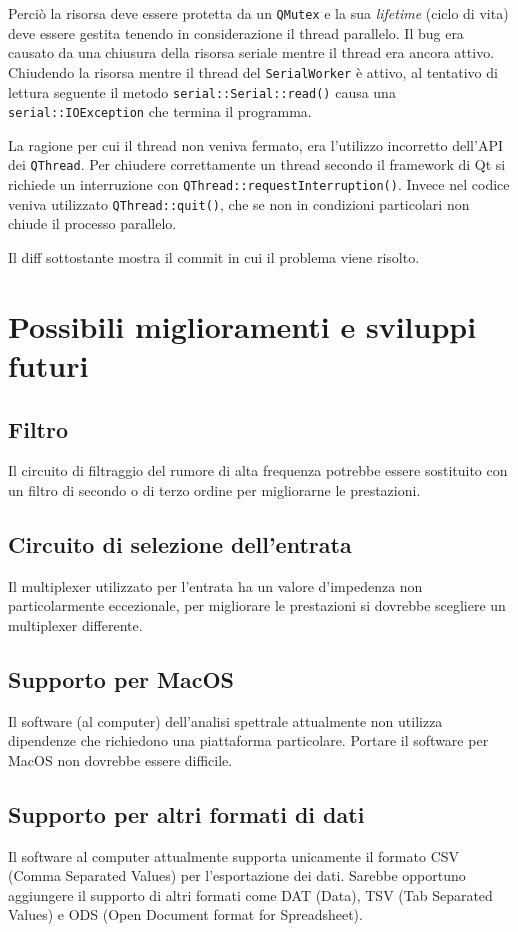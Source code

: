 Perci\`o la risorsa deve essere protetta da un \texttt{QMutex} e la sua
\emph{lifetime} (ciclo di vita) deve essere gestita tenendo in considerazione
il thread parallelo.  Il bug era causato da una chiusura della risorsa seriale
mentre il thread era ancora attivo.  Chiudendo la risorsa mentre il thread del
\texttt{SerialWorker} \`e attivo, al tentativo di lettura seguente il metodo
\texttt{serial::Serial::read()} causa una \texttt{serial::IOException} che
termina il programma.

La ragione per cui il thread non veniva fermato, era l'utilizzo incorretto
dell'API dei \texttt{QThread}. Per chiudere correttamente un thread secondo il
framework di Qt si richiede un interruzione con
\texttt{QThread::requestInterruption()}. Invece nel codice veniva utilizzato
\texttt{QThread::quit()}, che se non in condizioni particolari non chiude il
processo parallelo.

Il diff  sottostante mostra il commit in cui il problema viene risolto.


\section{Possibili miglioramenti e sviluppi futuri}
\subsection{Filtro}
Il circuito di filtraggio del rumore di alta frequenza potrebbe essere
sostituito con un filtro di secondo o di terzo ordine per migliorarne le
prestazioni.

\subsection{Circuito di selezione dell'entrata}
Il multiplexer utilizzato per l'entrata ha un valore d'impedenza non
particolarmente eccezionale, per migliorare le prestazioni si dovrebbe
scegliere un multiplexer differente.

\subsection{Supporto per MacOS}
Il software (al computer) dell'analisi spettrale attualmente non utilizza
dipendenze che richiedono una piattaforma particolare. Portare il software per
MacOS non dovrebbe essere difficile.

\subsection{Supporto per altri formati di dati}
Il software al computer attualmente supporta unicamente il formato CSV (Comma
Separated Values) per l'esportazione dei dati. Sarebbe opportuno aggiungere il
supporto di altri formati come DAT (Data), TSV (Tab Separated Values) e ODS
(Open Document format for Spreadsheet).

